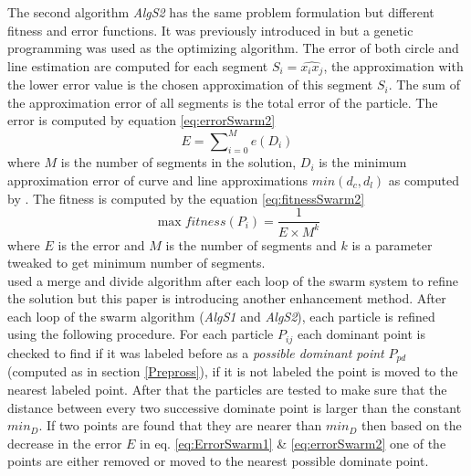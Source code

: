 \documentclass[a4paper,10pt]{IEEEconf}
\begin{document}
The second algorithm \textsl{AlgS2} has the same problem formulation but different fitness and error functions. It was previously introduced in \cite{CruveDivisionSwarm} but a genetic programming was used as the optimizing algorithm.  The error of both circle and line estimation are computed for each segment $S_i=\widehat{x_ix_j}$, the approximation with the lower error value is the chosen approximation of this segment $S_i$. The sum of the approximation error of all segments is the total error of the particle.  The error is computed by equation \ref{eq:errorSwarm2} \begin{equation}
E=\sum\nolimits_{i = 0}^M e(D_i) 
\label{eq:errorSwarm2}
\end{equation}where $M$ is the number of segments in the solution, $D_i$ is the minimum approximation error of curve and line approximations $min(d_c,d_l)$ as computed by \cite{CruveDivisionSwarm}.  The fitness is computed by the equation \ref{eq:fitnessSwarm2} \begin{equation}
\max fitness(P_i ) = \frac{1}{{E \times M^k }}
\label{eq:fitnessSwarm2}
\end{equation} where $E$ is the error and $M$ is the number of segments and $k$ is a parameter tweaked to get minimum number of segments. \\
\citeauthor{PolygonApproximationPSO} \cite{PolygonApproximationPSO} used a merge and divide algorithm after each loop of the swarm system to refine the solution but this paper is introducing another enhancement method. After each loop of the swarm algorithm (\textsl{AlgS1} and \textsl{AlgS2}), each particle is refined using the following procedure. For each particle $P_{ij}$ %
each dominant point is checked to find if it was labeled before as a \textit{possible dominant point} $P_{pd}$ (computed as in section \ref{Prepross}), if it is not labeled the point is moved to the nearest labeled point. After that the particles are tested to make sure that the distance between every two successive dominate point is larger than the constant $min_D$. If two points are found that they are nearer than $min_D$ then based on the decrease in the error $E$ in eq. \ref{eq:ErrorSwarm1} \& \ref{eq:errorSwarm2} one of the points are either removed or moved to the nearest possible dominate point. 
\end{document}
